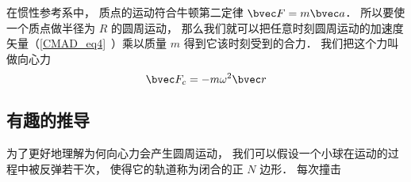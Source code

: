 

在惯性参考系中， 质点的运动符合牛顿第二定律 $\bvec F = m\bvec a$． 所以要使一个质点做半径为 $R$ 的圆周运动， 那么我们就可以把任意时刻圆周运动的加速度矢量（\autoref{CMAD_eq4}~）乘以质量 $m$ 得到它该时刻受到的合力． 我们把这个力叫做向心力
\begin{equation}
\bvec F_c = -m \omega^2 \bvec r
\end{equation}

\subsection{有趣的推导}
为了更好地理解为何向心力会产生圆周运动， 我们可以假设一个小球在运动的过程中被反弹若干次， 使得它的轨道称为闭合的正 $N$ 边形． 每次撞击
